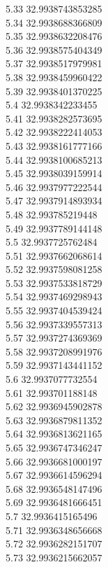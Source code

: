 {5.33	32.9938743853285\\
5.34	32.9938688366809\\
5.35	32.9938632208476\\
5.36	32.9938575404349\\
5.37	32.9938517979981\\
5.38	32.9938459960422\\
5.39	32.9938401370225\\
5.4	32.9938342233455\\
5.41	32.9938282573695\\
5.42	32.9938222414053\\
5.43	32.9938161777166\\
5.44	32.9938100685213\\
5.45	32.9938039159914\\
5.46	32.9937977222544\\
5.47	32.9937914893934\\
5.48	32.993785219448\\
5.49	32.9937789144148\\
5.5	32.9937725762484\\
5.51	32.9937662068614\\
5.52	32.9937598081258\\
5.53	32.9937533818729\\
5.54	32.9937469298943\\
5.55	32.9937404539424\\
5.56	32.9937339557313\\
5.57	32.9937274369369\\
5.58	32.9937208991976\\
5.59	32.9937143441152\\
5.6	32.9937077732554\\
5.61	32.993701188148\\
5.62	32.9936945902878\\
5.63	32.9936879811352\\
5.64	32.9936813621165\\
5.65	32.9936747346247\\
5.66	32.9936681000197\\
5.67	32.9936614596294\\
5.68	32.9936548147496\\
5.69	32.9936481666451\\
5.7	32.9936415165496\\
5.71	32.9936348656668\\
5.72	32.9936282151707\\
5.73	32.9936215662057\\
}
